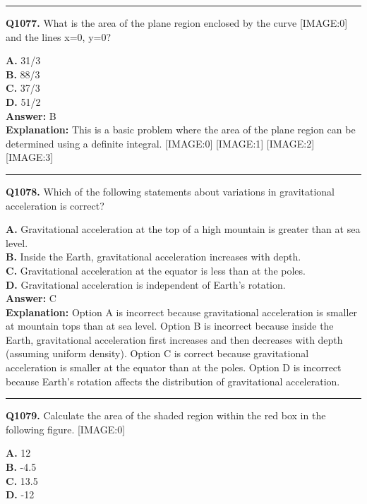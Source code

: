 \documentclass[12pt]{article}
\begin{document}
\hrule
\vspace{1em}


\noindent
\textbf{Q1077.} What is the area of the plane region enclosed by the curve
[IMAGE:0]
and the lines x=0, y=0?



\textbf{A.} 31/3 \\
\textbf{B.} 88/3 \\
\textbf{C.} 37/3 \\
\textbf{D.} 51/2 \\

\textbf{Answer:} B \\
\textbf{Explanation:} This is a basic problem where the area of the plane region can be determined using a definite integral.
[IMAGE:0]
[IMAGE:1]
[IMAGE:2]
[IMAGE:3]

\hrule
\vspace{1em}


\noindent
\textbf{Q1078.} Which of the following statements about variations in gravitational acceleration is correct?



\textbf{A.} Gravitational acceleration at the top of a high mountain is greater than at sea level. \\
\textbf{B.} Inside the Earth, gravitational acceleration increases with depth. \\
\textbf{C.} Gravitational acceleration at the equator is less than at the poles. \\
\textbf{D.} Gravitational acceleration is independent of Earth's rotation. \\

\textbf{Answer:} C \\
\textbf{Explanation:} Option A is incorrect because gravitational acceleration is smaller at mountain tops than at sea level. Option B is incorrect because inside the Earth, gravitational acceleration first increases and then decreases with depth (assuming uniform density). Option C is correct because gravitational acceleration is smaller at the equator than at the poles. Option D is incorrect because Earth's rotation affects the distribution of gravitational acceleration.

\hrule
\vspace{1em}


\noindent
\textbf{Q1079.} Calculate the area of the shaded region within the red box in the following figure.
[IMAGE:0]



\textbf{A.} 12 \\
\textbf{B.} -4.5 \\
\textbf{C.} 13.5 \\
\textbf{D.} -12 \\
\end{document}
